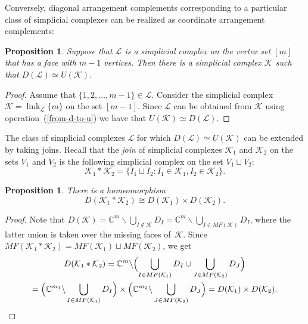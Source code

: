 \documentclass[a4paper,12pt]{amsart}
\newcommand{\K}{\mathcal K}
\newcommand{\CC}{\mathbb C}
\newtheorem{proposition}[formula]{Proposition}
\theoremstyle{definition}
\theoremstyle{remark}
\numberwithin{equation}{section}
\DeclareMathOperator{\link}{link}
\begin{document}
Conversely, diagonal arrangement complements corresponding to a particular class of simplicial complexes can be realized as coordinate arrangement complements:

\begin{proposition}\label{res1.5}
	Suppose that $\mathcal{L}$ is a simplicial complex on the vertex set $[m]$ that has a face with $m-1$ vertices.
	Then there is a simplicial complex $\K$ such that $D(\mathcal{L}) \simeq U(\K)$.
\end{proposition}
\begin{proof}
	Assume that $\{1, 2, \dots, m-1 \} \in \mathcal{L}$.
	Consider the simplicial complex
	$\K = \link_{\mathcal{L}}\{m\} $ on the set $[m-1]$. 
	Since $\mathcal{L}$ can be obtained from $\K$ using operation~(\ref{from-d-to-u}) we have that $U(\K) \simeq D(\mathcal{L})$.
\end{proof}

The class of simplicial complexes $\mathcal L$ for which $D(\mathcal L)\simeq U(\mathcal K)$ can be extended by taking joins. Recall that the \textit{join} of
simplicial complexes $\K_1$ and $\K_2$ on the sets $V_1$ and $V_2$ is the following simplicial complex on the set $V_1\sqcup V_2$:
$$\K_1 * \K_2 = \{ I_1 \sqcup I_2: I_1 \in \K_1, I_2 \in \K_2 \}.$$
\begin{proposition}
There is a homeomorphism
	$$D(\K_1 * \K_2) \cong D(\K_1) \times D(\K_2). $$
\end{proposition}
\begin{proof}
Note that $D(\K) = \CC^m \backslash \bigcup_{ I \notin \K } D_I= \CC^m \backslash \bigcup_{ I \in MF(\K)} D_I$, where the latter union is taken over the missing faces of~$\K$. Since $MF(\K_1 * \K_2) = MF(\K_1) \sqcup MF(\K_2)$, we get
\begin{multline*}D(\K_1 * \K_2) = \CC^m \backslash \Bigl({ \bigcup_{I \in MF(\K_1)} D_I \cup \bigcup_{J \in MF(\K_2)} D_J }\Bigr)\\ 
= \Bigl({ \CC^{m_1} \backslash \bigcup_{I \in MF(\K_1)} D_I }\Bigr) \times \Bigl({ \CC^{m_2} \backslash \bigcup_{J \in MF(\K_2)} D_J }\Bigr) = D(\K_1) \times D(\K_2). \qedhere
\end{multline*}
\end{proof}
\end{document}
